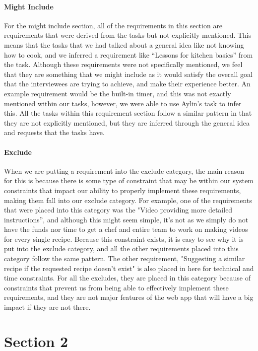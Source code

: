 \documentclass[11pt,english]{article}
\begin{document}
\paragraph{Might Include}
For the might include section, all of the requirements in this section are requirements that were derived from the tasks but not explicitly mentioned. This means that the tasks that we had talked about a general idea like not knowing how to cook, and we inferred a requirement like “Lessons for kitchen basics” from the task. Although these requirements were not specifically mentioned, we feel that they are something that we might include as it would satisfy the overall goal that the interviewees are trying to achieve, and make their experience better. An example requirement would be the built-in timer, and this was not exactly mentioned within our tasks, however, we were able to use Aylin’s task to infer this. All the tasks within this requirement section follow a similar pattern in that they are not explicitly mentioned, but they are inferred through the general idea and requests that the tasks have.
\paragraph{Exclude}
When we are putting a requirement into the exclude category, the main reason for this is because there is some type of constraint that may be within our system constraints that impact our ability to properly implement these requirements, making them fall into our exclude category. For example, one of the requirements that were placed into this category was the "Video providing more detailed instructions'', and although this might seem simple, it's not as we simply do not have the funds nor time to get a chef and entire team to work on making videos for every single recipe. Because this constraint exists, it is easy to see why it is put into the exclude category, and all the other requirements placed into this category follow the same pattern. The other requirement, "Suggesting a similar recipe if the requested recipe doesn't exist" is also placed in here for technical and time constraints. For all the excludes, they are placed in this category because of constraints that prevent us from being able to effectively implement these requirements, and they are not major features of the web app that will have a big impact if they are not there.
\newpage
\section{Section 2}
\end{document}
